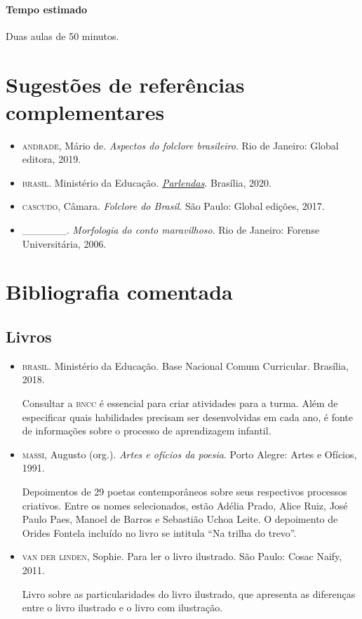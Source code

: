 \documentclass[11pt]{extarticle}
\begin{document}
\paragraph{Tempo estimado} Duas aulas de 50 minutos.

\section{Sugestões de referências complementares}


\begin{itemize}
\item \textsc{andrade}, Mário de. \textit{Aspectos do folclore brasileiro}. Rio de Janeiro: Global editora, 2019.

\item \textsc{brasil}. Ministério da Educação. \href{http://alfabetizacao.mec.gov.br/images/conta-pra-mim/livros/versao_digital/parlendas_versao_digital.pdf}{\textit{Parlendas}}. Brasília, 2020. 

\item \textsc{cascudo}, Câmara. \textit{Folclore do Brasil}. São Paulo: Global edições, 2017.

\item \_\_\_\_\_\_. \emph{Morfologia do conto maravilhoso}. Rio de Janeiro: Forense Universitária, 2006. 
\end{itemize}

\section{Bibliografia comentada}

\subsection{Livros}

\begin{itemize}
\item \textsc{brasil}. Ministério da Educação. Base Nacional Comum Curricular. Brasília, 2018.

Consultar a \textsc{bncc} é essencial para criar atividades para a turma. Além de especificar 
quais habilidades precisam ser desenvolvidas em cada ano, é fonte de informações sobre 
o processo de aprendizagem infantil. 

\item \textsc{massi}, Augusto (org.). \emph{Artes e ofícios da poesia}. Porto Alegre:
  Artes e Ofícios, 1991.

Depoimentos de 29 poetas contemporâneos sobre seus respectivos processos criativos. Entre os nomes selecionados, estão Adélia Prado, Alice Ruiz, José Paulo Paes, Manoel de Barros e
Sebastião Uchoa Leite. O depoimento de Orides Fontela incluído no livro se intitula ``Na trilha do trevo''.

\item \textsc{van der linden}, Sophie. Para ler o livro ilustrado. São Paulo: Cosac Naify, 2011.

Livro sobre as particularidades do livro ilustrado, que apresenta as diferenças entre o livro ilustrado e o livro com ilustração. 
\end{itemize}
\end{document}
